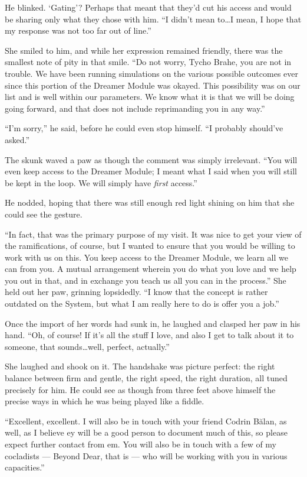 He blinked. `Gating'? Perhaps that meant that they'd cut his access and would be sharing only what they chose with him. ``I didn't mean to\ldots I mean, I hope that my response was not too far out of line.''

She smiled to him, and while her expression remained friendly, there was the smallest note of pity in that smile. ``Do not worry, Tycho Brahe, you are not in trouble. We have been running simulations on the various possible outcomes ever since this portion of the Dreamer Module was okayed. This possibility was on our list and is well within our parameters. We know what it is that we will be doing going forward, and that does not include reprimanding you in any way.''

``I'm sorry,'' he said, before he could even stop himself. ``I probably should've asked.''

The skunk waved a paw as though the comment was simply irrelevant. ``You will even keep access to the Dreamer Module; I meant what I said when you will still be kept in the loop. We will simply have \emph{first} access.''

He nodded, hoping that there was still enough red light shining on him that she could see the gesture.

``In fact, that was the primary purpose of my visit. It was nice to get your view of the ramifications, of course, but I wanted to ensure that you would be willing to work with us on this. You keep access to the Dreamer Module, we learn all we can from you. A mutual arrangement wherein you do what you love and we help you out in that, and in exchange you teach us all you can in the process.'' She held out her paw, grinning lopsidedly. ``I know that the concept is rather outdated on the System, but what I am really here to do is offer you a job.''

Once the import of her words had sunk in, he laughed and clasped her paw in his hand. ``Oh, of course! If it's all the stuff I love, and also I get to talk about it to someone, that sounds\ldots well, perfect, actually.''

She laughed and shook on it. The handshake was picture perfect: the right balance between firm and gentle, the right speed, the right duration, all tuned precisely for him. He could see as though from three feet above himself the precise ways in which he was being played like a fiddle.

``Excellent, excellent. I will also be in touch with your friend Codrin Bălan, as well, as I believe ey will be a good person to document much of this, so please expect further contact from em. You will also be in touch with a few of my cocladists — Beyond Dear, that is — who will be working with you in various capacities.''

